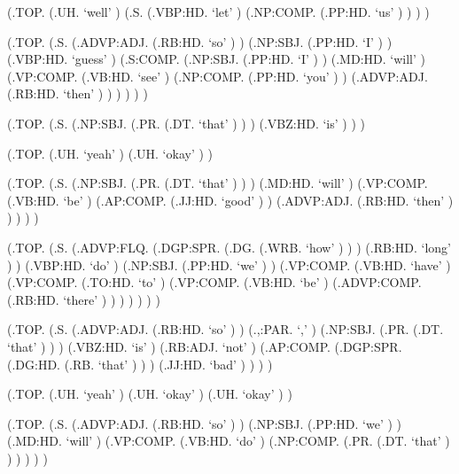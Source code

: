 \documentclass[10pt]{article}
\begin{document}
\begin{parsetree}  (.TOP. (.UH. `well' ) (.S. (.VBP:HD. `let' ) (.NP:COMP. (.PP:HD. `us' ) ) ) ) \end{parsetree}

\begin{parsetree}  (.TOP. (.S. (.ADVP:ADJ. (.RB:HD. `so' ) ) (.NP:SBJ. (.PP:HD. `I' ) ) (.VBP:HD. `guess' ) (.S:COMP. (.NP:SBJ. (.PP:HD. `I' ) ) (.MD:HD. `will' ) (.VP:COMP. (.VB:HD. `see' ) (.NP:COMP. (.PP:HD. `you' ) ) (.ADVP:ADJ. (.RB:HD. `then' ) ) ) ) ) ) \end{parsetree}

\begin{parsetree}  (.TOP. (.S. (.NP:SBJ. (.PR. (.DT. `that' ) ) ) (.VBZ:HD. `is' ) ) ) \end{parsetree}

\begin{parsetree}  (.TOP. (.UH. `yeah' ) (.UH. `okay' ) ) \end{parsetree}

\begin{parsetree}  (.TOP. (.S. (.NP:SBJ. (.PR. (.DT. `that' ) ) ) (.MD:HD. `will' ) (.VP:COMP. (.VB:HD. `be' ) (.AP:COMP. (.JJ:HD. `good' ) ) (.ADVP:ADJ. (.RB:HD. `then' ) ) ) ) ) \end{parsetree}

\begin{parsetree}  (.TOP. (.S. (.ADVP:FLQ. (.DGP:SPR. (.DG. (.WRB. `how' ) ) ) (.RB:HD. `long' ) ) (.VBP:HD. `do' ) (.NP:SBJ. (.PP:HD. `we' ) ) (.VP:COMP. (.VB:HD. `have' ) (.VP:COMP. (.TO:HD. `to' ) (.VP:COMP. (.VB:HD. `be' ) (.ADVP:COMP. (.RB:HD. `there' ) ) ) ) ) ) ) \end{parsetree}

\begin{parsetree}  (.TOP. (.S. (.ADVP:ADJ. (.RB:HD. `so' ) ) (.,:PAR. `,' ) (.NP:SBJ. (.PR. (.DT. `that' ) ) ) (.VBZ:HD. `is' ) (.RB:ADJ. `not' ) (.AP:COMP. (.DGP:SPR. (.DG:HD. (.RB. `that' ) ) ) (.JJ:HD. `bad' ) ) ) ) \end{parsetree}

\begin{parsetree}  (.TOP. (.UH. `yeah' ) (.UH. `okay' ) (.UH. `okay' ) ) \end{parsetree}

\begin{parsetree}  (.TOP. (.S. (.ADVP:ADJ. (.RB:HD. `so' ) ) (.NP:SBJ. (.PP:HD. `we' ) ) (.MD:HD. `will' ) (.VP:COMP. (.VB:HD. `do' ) (.NP:COMP. (.PR. (.DT. `that' ) ) ) ) ) ) \end{parsetree}
\end{document}
